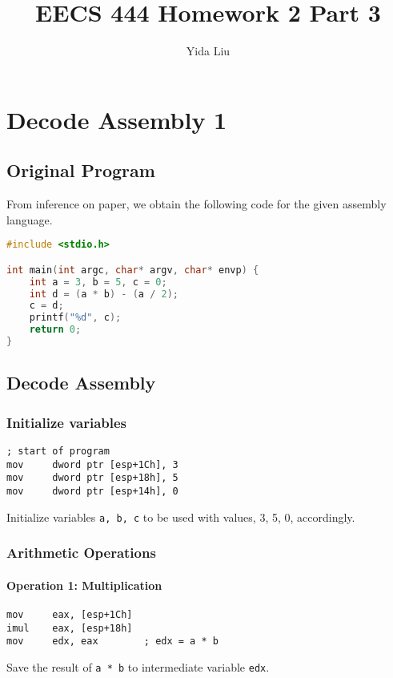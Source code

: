 \documentclass[11pt]{article}
\begin{document}
\author{Yida Liu}
\title{EECS 444 Homework 2 Part 3}
\maketitle

\section{Decode Assembly 1}
\subsection{Original Program}
From inference on paper, we obtain the following code for the given assembly language.
\begin{lstlisting}[language=C, style=CStyle]
#include <stdio.h>

int main(int argc, char* argv, char* envp) {
    int a = 3, b = 5, c = 0;
    int d = (a * b) - (a / 2);
    c = d;
    printf("%d", c);
    return 0;
}
\end{lstlisting}
\subsection{Decode Assembly}
\subsubsection{Initialize variables}
\begin{lstlisting}[language={[x86masm]Assembler}]
; start of program
mov     dword ptr [esp+1Ch], 3
mov     dword ptr [esp+18h], 5
mov     dword ptr [esp+14h], 0
\end{lstlisting}
Initialize variables \lstinline{a, b, c} to be used with values, 3, 5, 0, accordingly.

\subsubsection{Arithmetic Operations}
\paragraph{Operation 1: Multiplication}
\begin{lstlisting}[language={[x86masm]Assembler}]
mov     eax, [esp+1Ch]
imul    eax, [esp+18h]
mov     edx, eax        ; edx = a * b
\end{lstlisting}
Save the result of \lstinline{a * b} to intermediate variable \lstinline{edx}.
\end{document}

